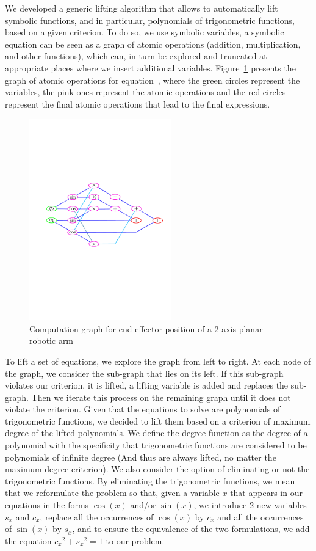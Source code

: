 We developed a generic lifting algorithm that allows to automatically lift symbolic functions, and in particular, polynomials of trigonometric functions, based on a given criterion.
To do so, we use symbolic variables, a symbolic equation can be seen as a graph of atomic operations (addition, multiplication, and other functions), which can, in turn be explored and truncated at appropriate places where we insert additional variables.
Figure~\ref{fig:graph_direct} presents the graph of atomic operations for equation~, where the green circles represent the variables, the pink ones represent the atomic operations and the red circles represent the final atomic operations that lead to the final expressions.
\begin{figure}
  \centering
  \includegraphics[width=0.55\textwidth]{graphDirectEEPos.pdf}
  \caption{Computation graph for end effector position of a 2 axis planar robotic arm}
\label{fig:graph_direct}
\end{figure}

To lift a set of equations, we explore the graph from left to right. At each node of the graph, we consider the sub-graph that lies on its left.
If this sub-graph violates our criterion, it is lifted, a lifting variable is added and replaces the sub-graph.
Then we iterate this process on the remaining graph until it does not violate the criterion.
Given that the equations to solve are polynomials of trigonometric functions, we decided to lift them based on a criterion of maximum degree of the lifted polynomials.
We define the degree function as the degree of a polynomial with the specificity that trigonometric functions are considered to be polynomials of infinite degree (And thus are always lifted, no matter the maximum degree criterion).
We also consider the option of eliminating or not the trigonometric functions.
By eliminating the trigonometric functions, we mean that we reformulate the problem so that, given a variable $x$ that appears in our equations in the forms $\cos(x)$ and/or $\sin(x)$, we introduce 2 new variables $s_x$ and $c_x$, replace all the occurrences of $\cos(x)$ by $c_x$ and all the occurrences of $\sin(x)$ by $s_x$, and to ensure the equivalence of the two formulations, we add the equation ${c_x}^2 + {s_x}^2=1$ to our problem.


